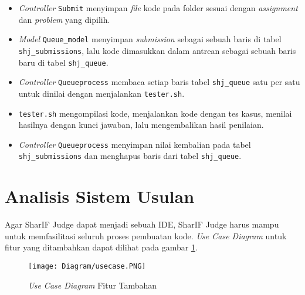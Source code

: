 \begin{itemize}
    \item \textit{Controller} \verb|Submit| menyimpan \textit{file} kode pada folder sesuai dengan \textit{assignment} dan \textit{problem} yang dipilih.
    \item \textit{Model} \verb|Queue_model| menyimpan \textit{submission} sebagai sebuah baris di tabel \verb|shj_submissions|, lalu kode dimasukkan dalam antrean sebagai sebuah baris baru di tabel \verb|shj_queue|.
    \item \textit{Controller} \verb|Queueprocess| membaca setiap baris tabel \verb|shj_queue| satu per satu untuk dinilai dengan menjalankan \verb|tester.sh|.
    \item \verb|tester.sh| mengompilasi kode, menjalankan kode dengan tes kasus, menilai hasilnya dengan kunci jawaban, lalu mengembalikan hasil penilaian.
    \item \textit{Controller} \verb|Queueprocess| menyimpan nilai kembalian pada tabel \verb|shj_submissions| dan menghapus baris dari tabel \verb|shj_queue|.
\end{itemize}

\section{Analisis Sistem Usulan}
\label{sec:3:analisisusulan} 
Agar SharIF Judge dapat menjadi sebuah IDE, SharIF Judge harus mampu untuk memfasilitasi seluruh proses pembuatan kode. \textit{Use Case Diagram} untuk fitur yang ditambahkan dapat dilihat pada gambar \ref{fig:3:usecase}.
   
    \begin{figure}[H]
    	\centering  
    	\texttt{[image: Diagram/usecase.PNG]}  
    	\caption{\textit{Use Case Diagram} Fitur Tambahan}
    	\label{fig:3:usecase} 
    \end{figure} 

